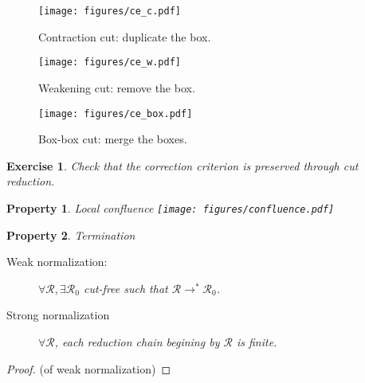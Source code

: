 \documentclass[a4paper,10pt]{article}
\newtheorem{prop}{Property}
\newtheorem{exo}{Exercise}
\begin{document}
	\begin{figure}[!h]
	\begin{center}
		\texttt{[image: figures/ce\_c.pdf]}
		\caption{Contraction cut: duplicate the box.}
		\label{fig:ce_c}
		\end{center}	
	\end{figure}	
	\begin{figure}[!h]
	\begin{center}
		\texttt{[image: figures/ce\_w.pdf]}
		\caption{Weakening cut: remove the box.}
		\label{fig:ce_w}
		\end{center}	
	\end{figure}	
	\begin{figure}[!h]
	\begin{center}
		\texttt{[image: figures/ce\_box.pdf]}
		\caption{Box-box cut: merge the boxes.}
		\label{fig:ce_box}
	\end{center}	
	\end{figure}	
	
	\begin{exo}
		Check that the correction criterion is preserved through cut reduction.
	\end{exo}	
	
	\begin{prop}{Local confluence}
	\texttt{[image: figures/confluence.pdf]}
	\end{prop}	

		\begin{prop}{Termination}
		\begin{description}
			\item[Weak normalization:] $\forall {\mathcal R}, \exists {\mathcal R_0}$ cut-free  such that ${\mathcal R} \rightarrow^* {\mathcal R_0}$.
			\item[Strong normalization] $\forall {\mathcal R}$, each reduction chain begining by ${\mathcal R}$ is finite.
		\end{description}		
		\end{prop}
		\begin{proof}{(of weak normalization)}
		\end{proof}				
\end{document}
